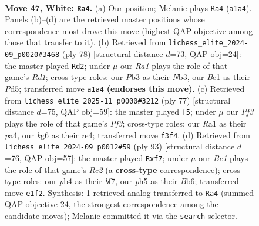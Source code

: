 \documentclass[11pt]{article}
\begin{document}
\clearpage

\begin{figure}[p]\centering
\begin{subfigure}{0.46\textwidth}\centering
\resizebox{\linewidth}{!}{%
\newchessgame
\chessboard[
  setfen={1rr2b2/7p/p2pn1k1/P3p1Pp/1pP1P3/1P3PR1/2K3B1/R3B3 w - - 8 47},
  showmover=false,
  pgfstyle=straightmove, color=movearrow, markmove={a1-a4}
]}
\caption{}
\end{subfigure}\hfill
\begin{subfigure}{0.46\textwidth}\centering
\resizebox{\linewidth}{!}{%
\newchessgame
\chessboard[
  setfen={2r1b3/rp3p2/5k2/P2Pbp2/1p5p/1N3PpP/RP4P1/3R1B1K w - - 10 40},
  showmover=false,
  pgfstyle=straightmove, color=movearrow, markmove={d1-d2}
]}
\caption{}
\end{subfigure}
\\[4pt]
\begin{subfigure}{0.46\textwidth}\centering
\resizebox{\linewidth}{!}{%
\newchessgame
\chessboard[
  setfen={1b6/1r1r2p1/p3kp1p/4p2P/PPp1RP2/2B2KP1/2P5/1R6 b - - 4 39},
  showmover=false,
  pgfstyle=straightmove, color=movearrow, markmove={f6-f5}
]}
\caption{}
\end{subfigure}\hfill
\begin{subfigure}{0.46\textwidth}\centering
\resizebox{\linewidth}{!}{%
\newchessgame
\chessboard[
  setfen={8/2r2Bpk/1bp2p2/p3pPp1/1r2P3/1P1P2KP/R1R1N1P1/8 b - - 0 47},
  showmover=false,
  pgfstyle=straightmove, color=movearrow, markmove={c7-f7}
]}
\caption{}
\end{subfigure}
\caption{\textbf{Move 47, White: \texttt{Ra4}.} (a) Our position; Melanie plays \texttt{Ra4} (\texttt{a1a4}). Panels (b)--(d) are the retrieved master positions whose correspondence most drove this move (highest QAP objective among those that transfer to it). (b) Retrieved from \texttt{lichess\_elite\_2024-09\_p0020\#3468} (ply 78) [structural distance $d$=73, QAP obj=24]: the master played \texttt{Rd2}; under $\mu$ our \emph{Ra1} plays the role of that game's \emph{Rd1}; cross-type roles: our \emph{P}b3 as their \emph{N}b3, our \emph{B}e1 as their \emph{P}d5; transferred move \texttt{a1a4} \textbf{(endorses this move)}. (c) Retrieved from \texttt{lichess\_elite\_2025-11\_p0000\#3212} (ply 77) [structural distance $d$=75, QAP obj=59]: the master played \texttt{f5}; under $\mu$ our \emph{Pf3} plays the role of that game's \emph{Pf3}; cross-type roles: our \emph{R}a1 as their \emph{p}a4, our \emph{k}g6 as their \emph{r}e4; transferred move \texttt{f3f4}. (d) Retrieved from \texttt{lichess\_elite\_2024-09\_p0012\#59} (ply 93) [structural distance $d$=76, QAP obj=57]: the master played \texttt{Rxf7}; under $\mu$ our \emph{Be1} plays the role of that game's \emph{Rc2} (a \textbf{cross-type} correspondence); cross-type roles: our \emph{p}b4 as their \emph{b}f7, our \emph{p}h5 as their \emph{B}b6; transferred move \texttt{e1f2}. Synthesis: 1 retrieved analog transferred to \texttt{Ra4} (summed QAP objective 24, the strongest correspondence among the candidate moves); Melanie committed it via the \texttt{search} selector.}
\label{fig:thought-m92}
\end{figure}
\end{document}
